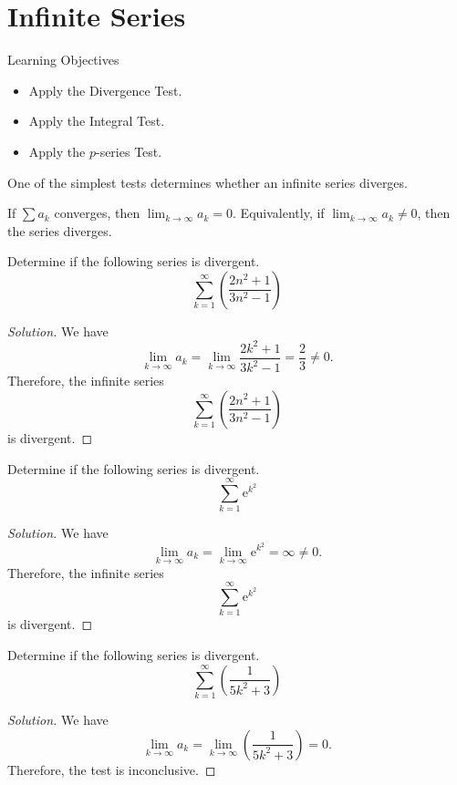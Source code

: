 \documentclass[compacto,10pt,comentarios]{aleph-notas}
\begin{document}
\encabezado

\section*{Infinite Series}
\begin{mdframed}
    \center Learning Objectives \\
    \begin{itemize}
        \item Apply the Divergence Test.
        \item Apply the Integral Test.
        \item Apply the $p$-series Test.
    \end{itemize}
\end{mdframed}

One of the simplest tests determines whether an infinite series diverges.
\begin{teo}
    If $\sum a_k$ converges, then $\lim_{k \to \infty} a_k = 0$. Equivalently, if $\lim_{k \to \infty} a_k \neq 0$, then the series diverges.
\end{teo}

\begin{ejer}
    Determine if the following series is divergent.
    $$
        \sum_{k=1}^{\infty} \left( \frac{2n^2 + 1}{3n^2 - 1} \right)
    $$
\end{ejer}
\begin{proof}[Solution]
    We have
    $$
        \lim_{k \to \infty} a_k = \lim_{k \to \infty} \frac{2k^2+1}{3k^2-1} = \frac{2}{3} \neq 0.
    $$
    Therefore, the infinite series
    $$
        \sum_{k=1}^{\infty} \left( \frac{2n^2 + 1}{3n^2 - 1} \right)
    $$
    is divergent.
\end{proof}

\begin{ejer}
    Determine if the following series is divergent.
    $$
        \sum_{k=1}^{\infty} \mathrm{e}^{k^2}
    $$
\end{ejer}
\begin{proof}[Solution]
    We have
    $$
        \lim_{k \to \infty} a_k = \lim_{k \to \infty} \mathrm{e}^{k^2} = \infty \neq 0.
    $$
    Therefore, the infinite series
    $$
        \sum_{k=1}^{\infty} \mathrm{e}^{k^2}
    $$
    is divergent.
\end{proof}

\begin{ejer}
    Determine if the following series is divergent.
    $$
        \sum_{k=1}^{\infty} \left( \frac{1}{5k^2 + 3} \right)
    $$
\end{ejer}
\begin{proof}[Solution]
    We have
    $$
        \lim_{k \to \infty} a_k = \lim_{k \to \infty} \left( \frac{1}{5k^2 + 3} \right) = 0.
    $$
    Therefore, the test is inconclusive.
\end{proof}
\end{document}
